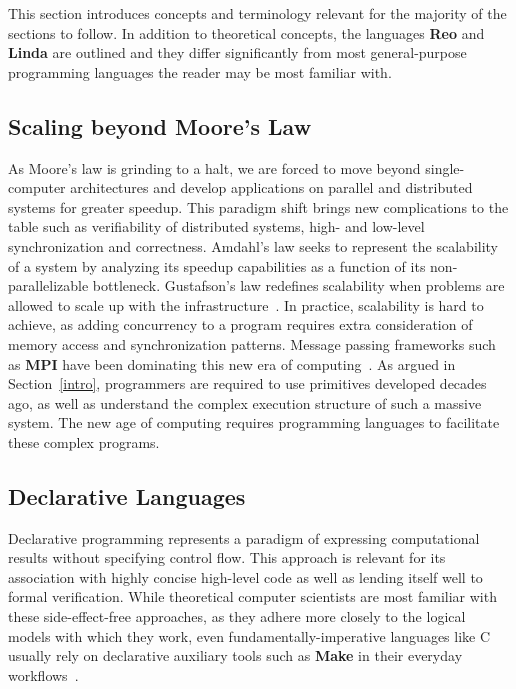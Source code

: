 
This section introduces concepts and terminology relevant for the majority of the sections to follow. In addition to theoretical concepts, the languages \textbf{Reo} and \textbf{Linda} are outlined and they differ significantly from most general-purpose programming languages the reader may be most familiar with.

\subsection{Scaling beyond Moore's Law}
As Moore's law is grinding to a halt, we are forced to move beyond single-computer architectures and develop applications on parallel and distributed systems for greater speedup. This paradigm shift brings new complications to the table such as verifiability of distributed systems, high- and low-level synchronization and correctness. Amdahl's law seeks to represent the scalability of a system by analyzing its speedup capabilities as a function of its non-parallelizable bottleneck. Gustafson's law redefines scalability when problems are allowed to scale up with the infrastructure~\cite{amdahls}. In practice, scalability is hard to achieve, as adding concurrency to a program requires extra consideration of memory access and synchronization patterns. Message passing frameworks such as \textbf{MPI} have been dominating this new era of computing~\cite{MPI}. As argued in Section~\ref{intro}, programmers are required to use primitives developed decades ago, as well as understand the complex execution structure of such a massive system. The new age of computing requires programming languages to facilitate these complex programs.

\subsection{Declarative Languages}
Declarative programming represents a paradigm of expressing computational results without specifying control flow. This approach is relevant for its association with highly concise high-level code as well as lending itself well to formal verification. While theoretical computer scientists are most familiar with these side-effect-free approaches, as they adhere more closely to the logical models with which they work, even fundamentally-imperative languages like C usually rely on declarative auxiliary tools such as \textbf{Make} in their everyday workflows~\cite{makefiles}.

